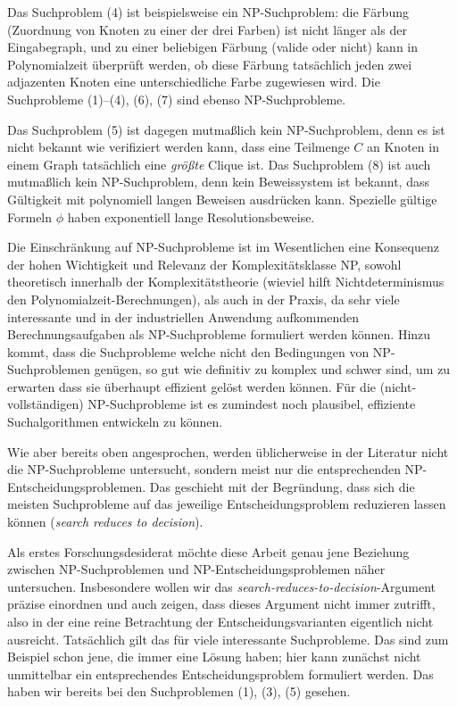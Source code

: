 Das Suchproblem (4) ist beispielsweise ein NP-Suchproblem: die Färbung (Zuordnung von Knoten zu einer der drei Farben) ist nicht länger als der Eingabegraph, und zu einer beliebigen Färbung (valide oder nicht) kann in Polynomialzeit überprüft werden, ob diese Färbung tatsächlich jeden zwei adjazenten Knoten eine unterschiedliche Farbe zugewiesen wird.
Die Suchprobleme (1)--(4), (6), (7) sind ebenso NP-Suchprobleme.

Das Suchproblem (5) ist dagegen mutmaßlich kein NP-Suchproblem, denn es ist nicht bekannt wie verifiziert werden kann, dass eine Teilmenge $C$ an Knoten in einem Graph tatsächlich eine \emph{größte} Clique ist.
Das Suchproblem (8) ist auch mutmaßlich kein NP-Suchproblem, denn kein Beweissystem ist bekannt, dass Gültigkeit mit polynomiell langen Beweisen ausdrücken kann. Spezielle gültige Formeln $\phi$ haben exponentiell lange Resolutionsbeweise.

Die Einschränkung auf NP-Suchprobleme ist im Wesentlichen eine Konsequenz der hohen Wichtigkeit und Relevanz der Komplexitätsklasse NP, sowohl theoretisch innerhalb der Komplexitätstheorie (wieviel hilft Nichtdeterminismus den Polynomialzeit-Berechnungen), als auch in der Praxis, da sehr viele interessante und in der industriellen Anwendung aufkommenden Berechnungsaufgaben als  NP-Suchprobleme formuliert werden können. Hinzu kommt, dass die Suchprobleme welche nicht den Bedingungen von NP-Suchproblemen genügen, so gut wie definitiv zu komplex und schwer sind, um zu erwarten dass sie überhaupt effizient gelöst werden können. Für die (nicht-vollständigen) NP-Suchprobleme ist es zumindest noch plausibel, effiziente Suchalgorithmen entwickeln zu können.

Wie aber bereits oben angesprochen, werden üblicherweise in der Literatur nicht die NP-Suchprobleme untersucht, sondern meist nur die entsprechenden NP-Entscheidungsproblemen. Das geschieht mit der Begründung, dass sich die meisten Suchprobleme auf das jeweilige Entscheidungsproblem reduzieren lassen können (\emph{search reduces to decision}). 

Als erstes Forschungsdesiderat möchte diese Arbeit genau jene Beziehung zwischen NP-Suchproblemen und NP-Entscheidungsproblemen näher untersuchen. 
Insbesondere wollen wir das \emph{search-reduces-to-decision}-Argument präzise einordnen und auch zeigen, dass dieses Argument nicht immer zutrifft, also in der eine reine Betrachtung der Entscheidungsvarianten eigentlich nicht ausreicht. Tatsächlich gilt das für viele interessante Suchprobleme. Das sind zum Beispiel schon jene, die immer eine Lösung haben; hier kann zunächst nicht unmittelbar ein entsprechendes Entscheidungsproblem formuliert werden.
Das haben wir bereits bei den Suchproblemen (1), (3), (5) gesehen.

